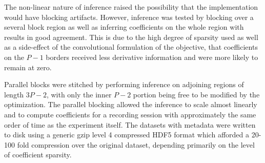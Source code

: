 \documentclass[10pt]{article}
\begin{document}
The non-linear nature of inference raised the possibility that the
implementation would have blocking artifacts. However, inference was
tested by blocking over a several block region as well as inferring
coefficients on the whole region with results in good agreement. This
is due to the high degree of sparsity used as well as a side-effect of
the convolutional formulation of the objective, that coefficients on
the $P-1$ borders received less derivative information and were more
likely to remain at zero.

Parallel blocks were stitched by performing inference on adjoining
regions of length $3P-2$, with only the inner $P-2$ portion being free
to be modified by the optimization. The parallel blocking allowed the
inference to scale almost linearly and to compute coefficients for a
recording session with approximately the same order of time as the
experiment itself. The datasets with metadata were written to disk
using a generic gzip level 4 compressed HDF5 format which afforded a
20-100 fold compression over the original dataset, depending primarily
on the level of coefficient sparsity.
\end{document}
